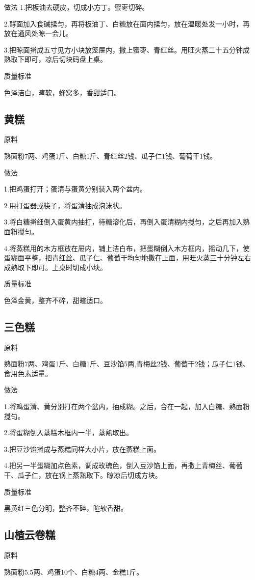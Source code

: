 \documentclass{ctexbook}
\begin{document}
做法
1.把板油去硬皮，切成小方丁。蜜枣切碎。

2.酵面加入食碱揉匀，再将板油丁、白糖放在面内揉匀，放在温暖处发一小时，再放在通风处晾一会儿。

3.把晾面擀成五寸见方小块放笼屉内，撒上蜜枣、青红丝。用旺火蒸二十五分钟成熟取下即可，凉后切块码盘上桌。

质量标准

色泽洁白，暄软，蜂窝多，香甜适口。
\subsection{黄糕}
原料

熟面粉7两、鸡蛋1斤、白糖1斤、青红丝2钱、瓜子仁1钱、葡萄干1钱。

做法

1.把鸡蛋打开；蛋清与蛋黄分别装入两个盆内。

2.用打蛋器或筷子，将蛋清抽成泡沫状。

3.将白糖擀细倒入蛋黄内抽打，待糖溶化后，再倒入蛋清糊内搅匀，之后再加入熟面粉搅匀。

4.将蒸糕用的木方框放在屉内，铺上洁白布，把蛋糊倒入木方框内，摇动几下，使蛋糊面平整，把青红丝、瓜子仁、葡萄干均匀地撒在上面，用旺火蒸三十分钟左右成熟取下即可。上桌时切成小块。

质量标准

色泽金黄，整齐不碎，甜暄适口。
\subsection{三色糕}
原料

熟面粉7两、鸡蛋1斤、白糖1斤、豆沙馅5两,青梅丝2钱、葡萄干2钱；瓜子仁1钱、食用色素适量。

做法

1.将鸡蛋清、黄分别打在两个盆内，抽成糊。之后，合在一起，加入白糖、熟面粉搅匀。

2.将蛋糊倒入蒸糕木框内一半，蒸熟取出。

3.把豆沙馅擀成与蒸糕同样大小片，放在蒸糕上面。

4.把另一半蛋糊加点色素，调成玫瑰色，倒入豆沙馅上面，再撒上青梅丝、葡萄干、瓜子仁，放在锅上蒸熟取下。晾凉后切成方块。

质量标准

黑黄红三色分明，整齐不碎，暄软香甜。
\subsection{山楂云卷糕}
原料

熟面粉5.5两、鸡蛋10个、白糖4两、金糕1斤。
\end{document}

